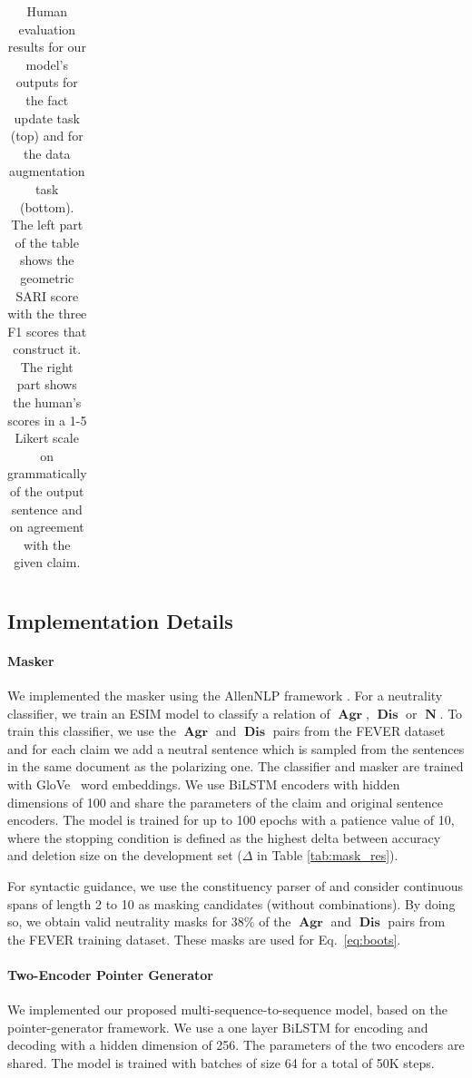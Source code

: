 \documentclass[letterpaper]{article} %
\newcommand{\tabref}[1]{Table \ref{#1}}
\renewcommand{\eqref}[1]{Eq.~\ref{#1}}
\DeclareMathOperator{\A}{\boldsymbol{Agr}}
\DeclareMathOperator{\D}{\boldsymbol{Dis}}
\DeclareMathOperator{\N}{\boldsymbol{N}}
\begin{document}
\begin{table}[t]
\begin{tabular}{llrrrrccc}
\bottomrule
\end{tabular}
\caption{Human evaluation results for our model's outputs for the fact update task (top) and for the data augmentation task (bottom).
The left part of the table shows the geometric SARI score with the three \textsc{F1} scores that construct it.
The right part shows the human's scores in a 1-5 Likert scale on grammatically of the output sentence and on agreement with the given claim.}\label{tab:symmetric_auto_res}

\end{table}


\subsection{Implementation Details}

\paragraph{Masker}
We implemented the masker using the AllenNLP framework \cite{Gardner2017AllenNLP}. For a neutrality classifier, we train an ESIM model \cite{chen2017enhanced} to classify a relation of $\A$, $\D$ or $\N$. To train this classifier, we use the $\A$ and $\D$ pairs from the FEVER dataset and for each claim we add a neutral sentence which is sampled from the sentences in the same document as the polarizing one. The classifier and masker are trained with GloVe~\cite{pennington-etal-2014-glove} word embeddings. We use BiLSTM \cite{sak2014long} encoders with hidden dimensions of 100 and share the parameters of the claim and original sentence encoders. The model is trained for up to 100 epochs with a patience value of 10, where the stopping condition is defined as the highest delta between accuracy and deletion size on the development set ($\Delta$ in \tabref{tab:mask_res}).%

For syntactic guidance, we use the constituency parser of \cite{stern-etal-2017-minimal} and consider continuous spans of length 2 to 10 as masking candidates (without combinations). By doing so, we obtain valid neutrality masks for 38\% of the $\A$ and $\D$ pairs from the FEVER training dataset. These masks are used for \eqref{eq:boots}.

\paragraph{Two-Encoder Pointer Generator}
We implemented our proposed multi-sequence-to-sequence model, based on the pointer-generator framework.%
We use a one layer BiLSTM for encoding and decoding with a hidden dimension of 256. The parameters of the two encoders are shared. The model is trained with batches of size 64 for a total of 50K steps.%
\end{document}
